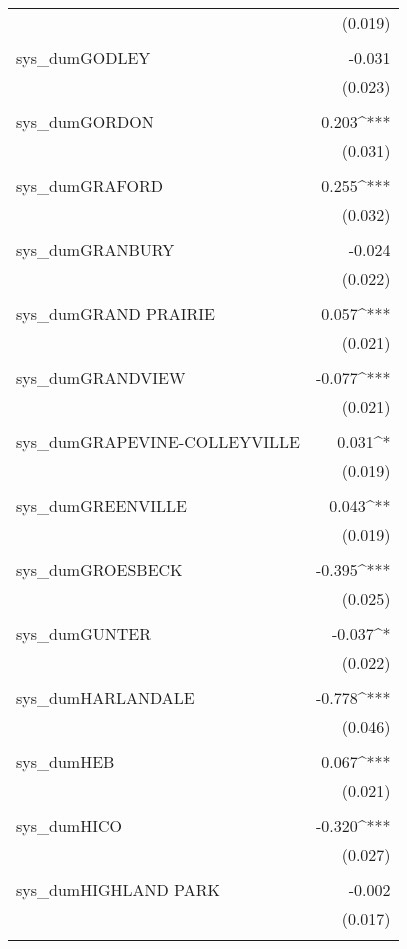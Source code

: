 \begin{table}[!htbp]
\begin{tabular}{@{\extracolsep{5pt}}lD{.}{.}{-3} }
  & (0.019) \\ 
  & \\ 
 sys\_dumGODLEY & -0.031 \\ 
  & (0.023) \\ 
  & \\ 
 sys\_dumGORDON & 0.203^{***} \\ 
  & (0.031) \\ 
  & \\ 
 sys\_dumGRAFORD & 0.255^{***} \\ 
  & (0.032) \\ 
  & \\ 
 sys\_dumGRANBURY & -0.024 \\ 
  & (0.022) \\ 
  & \\ 
 sys\_dumGRAND PRAIRIE & 0.057^{***} \\ 
  & (0.021) \\ 
  & \\ 
 sys\_dumGRANDVIEW & -0.077^{***} \\ 
  & (0.021) \\ 
  & \\ 
 sys\_dumGRAPEVINE-COLLEYVILLE & 0.031^{*} \\ 
  & (0.019) \\ 
  & \\ 
 sys\_dumGREENVILLE & 0.043^{**} \\ 
  & (0.019) \\ 
  & \\ 
 sys\_dumGROESBECK & -0.395^{***} \\ 
  & (0.025) \\ 
  & \\ 
 sys\_dumGUNTER & -0.037^{*} \\ 
  & (0.022) \\ 
  & \\ 
 sys\_dumHARLANDALE & -0.778^{***} \\ 
  & (0.046) \\ 
  & \\ 
 sys\_dumHEB & 0.067^{***} \\ 
  & (0.021) \\ 
  & \\ 
 sys\_dumHICO & -0.320^{***} \\ 
  & (0.027) \\ 
  & \\ 
 sys\_dumHIGHLAND PARK & -0.002 \\ 
  & (0.017) \\ 
  & \\ 

\end{tabular}
\end{table}
